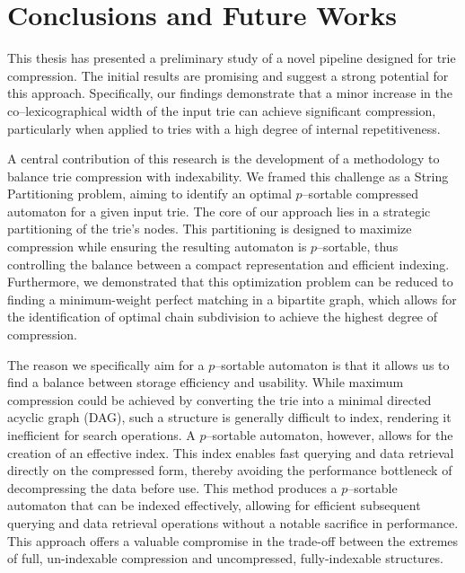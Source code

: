 \chapter{Conclusions and Future Works} \label{chp:conclusions}
This thesis has presented a preliminary study of a novel pipeline designed for trie compression. The initial results are promising and suggest a strong potential for this approach. Specifically, our findings demonstrate that a minor increase in the co--lexicographical width of the input trie can achieve significant compression, particularly when applied to tries with a high degree of internal repetitiveness.

A central contribution of this research is the development of a methodology to balance trie compression with indexability. We framed this challenge as a String Partitioning problem, aiming to identify an optimal $p$--sortable compressed automaton for a given input trie. The core of our approach lies in a strategic partitioning of the trie's nodes. This partitioning is designed to maximize compression while ensuring the resulting automaton is $p$--sortable, thus controlling the balance between a compact representation and efficient indexing. Furthermore, we demonstrated that this optimization problem can be reduced to finding a minimum-weight perfect matching in a bipartite graph, which allows for the identification of optimal chain subdivision to achieve the highest degree of compression.

The reason we specifically aim for a $p$--sortable automaton is that it allows us to find a balance between storage efficiency and usability. While maximum compression could be achieved by converting the trie into a minimal directed acyclic graph (DAG), such a structure is generally difficult to index, rendering it inefficient for search operations. A $p$--sortable automaton, however, allows for the creation of an effective index. This index enables fast querying and data retrieval directly on the compressed form, thereby avoiding the performance bottleneck of decompressing the data before use. This method produces a $p$--sortable automaton that can be indexed effectively, allowing for efficient subsequent querying and data retrieval operations without a notable sacrifice in performance. This approach offers a valuable compromise in the trade-off between the extremes of full, un-indexable compression and uncompressed, fully-indexable structures.


